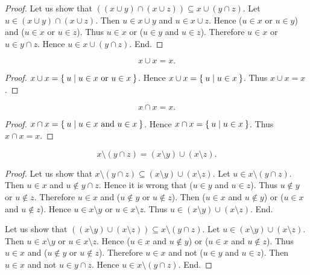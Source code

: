 \documentclass[../../sets-and-functions.ftl.tex]{subfiles}
\begin{document}
\begin{forthel}
\begin{proof}
      Let us show that $((x \cup y) \cap (x \cup z)) \subseteq x \cup (y \cap z)$.
        Let $u \in (x \cup y) \cap (x \cup z)$.
        Then $u \in x \cup y$ and $u \in x \cup z$.
        Hence ($u \in x$ or $u \in y$) and ($u \in x$ or $u \in z$).
        Thus $u \in x$ or ($u \in y$ and $u \in z$).
        Therefore $u \in x$ or $u \in y \cap z$.
        Hence $u \in x \cup (y \cap z)$.
      End.
    \end{proof}

    \begin{proposition}\label{SetTheory_01_01_496190}
      \[ x \cup x = x. \]
    \end{proposition}
    \begin{proof}
      $x \cup x = \Set{u | \text{$u \in x$ or $u \in x$}}$.
      Hence $x \cup x = \Set{u | u \in x}$.
      Thus $x \cup x = x$.
    \end{proof}


    \begin{proposition}\label{SetTheory_01_01_783425}
      \[ x \cap x = x. \]
    \end{proposition}
    \begin{proof}
      $x \cap x = \Set{u | \text{$u \in x$ and $u \in x$}}$.
      Hence $x \cap x = \Set{u | u \in x}$.
      Thus $x \cap x = x$.
    \end{proof}

    \begin{proposition}\label{SetTheory_01_01_339365}
      \[ x \setminus (y \cap z) = (x \setminus y) \cup (x \setminus z). \]
    \end{proposition}
    \begin{proof}
      Let us show that $x \setminus (y \cap z) \subseteq (x \setminus y) \cup (x \setminus z)$.
        Let $u \in x \setminus (y \cap z)$.
        Then $u \in x$ and $u \notin y \cap z$.
        Hence it is wrong that ($u \in y$ and $u \in z$).
        Thus $u \notin y$ or $u \notin z$.
        Therefore $u \in x$ and ($u \notin y$ or $u \notin z$).
        Then ($u \in x$ and $u \notin y$) or ($u \in x$ and $u \notin z$).
        Hence $u \in x \setminus y$ or $u \in x \setminus z$.
        Thus $u \in (x \setminus y) \cup (x \setminus z)$.
      End.

      Let us show that $((x \setminus y) \cup (x \setminus z)) \subseteq x \setminus (y \cap z)$.
        Let $u \in (x \setminus y) \cup (x \setminus z)$.
        Then $u \in x \setminus y$ or $u \in x \setminus z$.
        Hence ($u \in x$ and $u \notin y$) or ($u \in x$ and $u \notin z$).
        Thus $u \in x$ and ($u \notin y$ or $u \notin z$).
        Therefore $u \in x$ and not ($u \in y$ and $u \in z$).
        Then $u \in x$ and not $u \in y \cap z$.
        Hence $u \in x \setminus (y \cap z)$.
      End.
    \end{proof}



\end{forthel}
\end{document}
